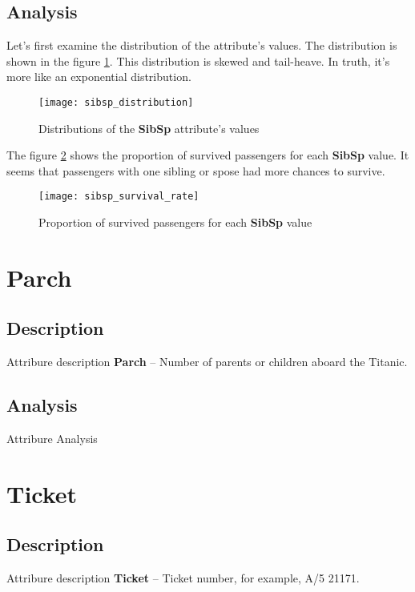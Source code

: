 \subsection{Analysis}
Let's first examine the distribution of the attribute's values. The
distribution is shown in the figure \ref{pic:sibsp_distribution}. This
distribution is skewed and tail-heave. In truth, it's more like an 
exponential distribution.

\begin{figure}[!ht]
    \centering
    \texttt{[image: sibsp\_distribution]}
    \caption{Distributions of the \textbf{SibSp} attribute's values}
    \label{pic:sibsp_distribution}
\end{figure}

The figure \ref{pic:sibsp_survival_rate} shows the proportion of survived
passengers for each \textbf{SibSp} value. It seems that passengers with
one sibling or spose had more chances to survive.

\begin{figure}[!ht]
    \centering
    \texttt{[image: sibsp\_survival\_rate]}
    \caption{Proportion of survived passengers for each \textbf{SibSp}
             value}
    \label{pic:sibsp_survival_rate}
\end{figure}


\section{Parch} \label{section:Parch}
\subsection{Description}
Attribure description
\textbf{Parch} -- Number of parents or children aboard the Titanic.

\subsection{Analysis}
Attribure Analysis


\section{Ticket} \label{section:Ticket}
\subsection{Description}
Attribure description
\textbf{Ticket} -- Ticket number, for example, A/5 21171.

